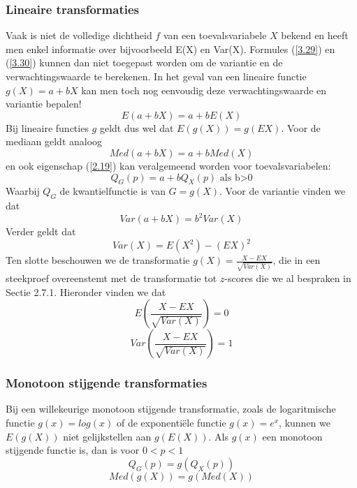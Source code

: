 \documentclass[titlepage]{article}
\numberwithin{equation}{section}
\begin{document}
 \subsubsection{Lineaire transformaties}
 Vaak is niet de volledige dichtheid $f$ van een toevalsvariabele $X$ bekend en heeft men enkel informatie over bijvoorbeeld E(X) en Var(X). Formules (\ref{3.29}) en (\ref{3.30}) kunnen dan niet toegepast worden om de variantie en de verwachtingswaarde te berekenen. In het geval van een lineaire functie $g(X) = a + bX$ kan men toch nog eenvoudig deze verwachtingswaarde en variantie bepalen!
 \begin{equation}
 	E(a+bX) = a+bE(X)
 	\label{3.33}
 \end{equation}
 Bij lineaire functies $g$ geldt dus wel dat $E(g(X))=g(EX)$. Voor de mediaan geldt analoog
 \begin{equation}
 	Med(a+bX) = a + bMed(X)
 	\label{3.34}
 \end{equation}
 en ook eigenschap (\ref{2.19}) kan veralgemeend worden voor toevalsvariabelen:
 \begin{equation}
 	Q_G(p) = a + b Q_X(p) \text{    als b>0}
 	\label{3.35}
 \end{equation}
 Waarbij $Q_G$ de kwantielfunctie is van $G = g(X)$.\newline
 Voor de variantie vinden we dat
 \begin{equation}
 	Var(a + bX) = b^2Var(X)
 	\label{3.36}
 \end{equation}
 Verder geldt dat
 \begin{equation}
 	Var(X) = E(X^2) - (EX)^2
 	\label{3.37}
 \end{equation}
 Ten slotte beschouwen we de transformatie $g(X) = \frac{X-EX}{\sqrt{Var(X)}}$, die in een steekproef overeenstemt met de transformatie tot $z$-scores die we al bespraken in Sectie 2.7.1. Hieronder vinden we dat
 \begin{equation}
 	E\left(\frac{X-EX}{\sqrt{Var(X)}}\right) = 0
 	\label{3.38}
 \end{equation}
 \begin{equation}
 	Var\left(\frac{X-EX}{\sqrt{Var(X)}}\right) = 1
 	\label{3.39}
 \end{equation}
 \subsubsection{Monotoon stijgende transformaties}
 Bij een willekeurige monotoon stijgende transformatie, zoals de logaritmische functie $g(x) = log(x)$ of de exponentiële functie $g(x) = e^x$, kunnen we $E(g(X))$ niet gelijkstellen aan $g(E(X))$.\newline
 Als $g(x)$ een monotoon stijgende functie is, dan is voor $0<p<1$
 \begin{equation}
 	Q_G(p) = g(Q_X(p))
 	\label{3.40}
 \end{equation}
 \begin{equation}
 	Med(g(X)) = g(Med(X))
 	\label{3.41}
 \end{equation}
\end{document}
